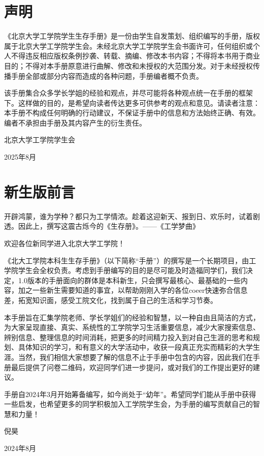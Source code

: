\documentclass[11pt,oneside]{book}
\begin{document}
\chapter*{声明}

《北京大学工学院学生生存手册》是一份由学生自发策划、组织编写的手册，版权属于北京大学工学院学生会。未经北京大学工学院学生会书面许可，任何组织或个人不得违反相应版权条例抄袭、转载、摘编、修改本书内容；不得将本书用于商业目的；不得对本手册原意进行曲解、修改和未授权的大范围分发。对于未经授权传播手册全部或部分内容而造成的各种问题，手册编者概不负责。

该手册集合众多学长学姐的经验和观点，并尽可能将各种观点统一在手册的框架下。这样做的目的，是希望向读者传达更多可供参考的观点和意见。请读者注意：本手册不构成任何明确的行动建议，不保证手册中的信息和方法始终正确、有效。编者不承担由手册及其内容产生的衍生责任。
\begin{flushright}
    北京大学工学院学生会

    2025年8月
\end{flushright}

\chapter*{新生版前言}
开辟鸿蒙，谁为学种？都只为工学情浓。趁着这迎新天、报到日、欢乐时，试着剧透。因此上，撰写这震古烁今的《生存册》。——《工学梦曲》

欢迎各位新同学进入北京大学工学院！

《北大工学院本科生生存手册》（以下简称“手册”）的撰写是一个长期项目，由工学院学生会全权负责。考虑到手册编写的目的是尽可能及时造福同学们，我们决定，1.0版本的手册面向的群体是本科新生，只会撰写最核心、最基础的一些内容，加之一些新生需要知道的事宜，以帮助刚刚入学的各位coeer快速弥合信息差，拓宽知识面，感受工院文化，找到属于自己的生活和学习节奏。

本手册旨在汇集学院老师、学长学姐们的经验和智慧，以一种自由且简洁的方式，为大家呈现直接、真实、系统性的工学院学习生活重要信息，减少大家搜索信息、辨别信息、整理信息的时间消耗，把更多的时间精力投入到对自己生涯的思考和规划、具体知识的学习，和有意义的大学活动中，收获一段真正充实而精彩的大学生涯。当然，我们相信大家想要了解的信息不止于手册中包含的内容，因此我们在手册最后提供了问卷二维码，欢迎同学们进一步提问，或对我们的工作提出更好的建议。

手册自2024年3月开始筹备编写，如今尚处于“幼年”。希望同学们能从手册中获得一些启发，也希望更多的同学积极加入工学院学生会，为手册的编写贡献自己的智慧和力量！
\begin{flushright}
    倪昊

    2024年8月
\end{flushright}
\end{document}
